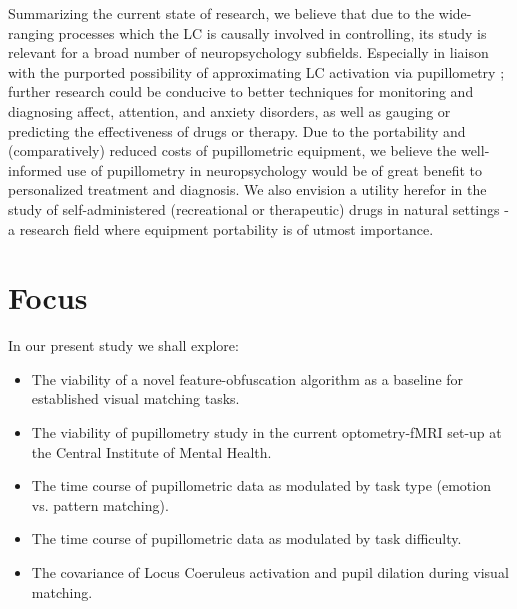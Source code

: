 	Summarizing the current state of research, we believe that due to the wide-ranging processes which the LC is causally involved in controlling, its study is relevant for a broad number of neuropsychology subfields.
	Especially in liaison with the purported possibility of approximating LC activation via pupillometry \citep{Gilzenrat2010,Murphy2011}; further research could be conducive to better techniques for monitoring and diagnosing affect, attention, and anxiety disorders, as well as gauging or predicting the effectiveness of drugs or therapy.
	Due to the portability \citep{Bradley2010} and (comparatively) reduced costs of pupillometric equipment, we believe the well-informed use of pupillometry in neuropsychology would be of great benefit to personalized treatment and diagnosis.
	We also envision a utility herefor in the study of self-administered (recreational or therapeutic) drugs in natural settings - a research field where equipment portability is of utmost importance.
    \section{Focus}
	In our present study we shall explore:
	\begin{itemize}
	    \item The viability of a novel feature-obfuscation algorithm as a baseline for established visual matching tasks.
	    \item The viability of pupillometry study in the current optometry-fMRI set-up at the Central Institute of Mental Health.
	    \item The time course of pupillometric data as modulated by task type (emotion vs. pattern matching).
	    \item The time course of pupillometric data as modulated by task difficulty.
	    \item The covariance of Locus Coeruleus activation and pupil dilation during visual matching.
	\end{itemize}
	

